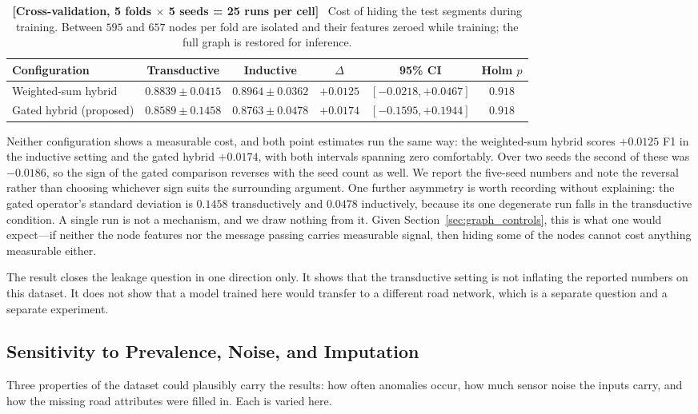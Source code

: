 \documentclass[journal]{IEEEtran}
\begin{document}
\begin{table}[!t]
  \centering
  \caption{\textbf{[Cross-validation, 5 folds $\times$ 5 seeds = 25 runs per
  cell]}~ Cost of hiding the test segments during training. Between $595$ and
  $657$ nodes per fold are isolated and their features zeroed while training;
  the full graph is restored for inference.}
  \label{tab:inductive}
  \renewcommand{\arraystretch}{1.2}
  \footnotesize
  \begin{tabular}{@{}lccccc@{}}
    \toprule
    \textbf{Configuration} & \textbf{Transductive} & \textbf{Inductive}
    & \textbf{$\Delta$} & \textbf{95\% CI} & \textbf{Holm $p$} \\ \midrule
    Weighted-sum hybrid & $0.8839 \pm 0.0415$ & $0.8964 \pm 0.0362$ & $+0.0125$ & $[-0.0218, +0.0467]$ & $0.918$ \\
    Gated hybrid (proposed) & $0.8589 \pm 0.1458$ & $0.8763 \pm 0.0478$ & $+0.0174$ & $[-0.1595, +0.1944]$ & $0.918$ \\
    \bottomrule
  \end{tabular}
\end{table}

Neither configuration shows a measurable cost, and both point estimates run
the same way: the weighted-sum hybrid scores $+0.0125$ F1 in the inductive
setting and the gated hybrid $+0.0174$, with both intervals spanning zero
comfortably. Over two seeds the second of these was $-0.0186$, so the sign
of the gated comparison reverses with the seed count as well. We report the
five-seed numbers and note the reversal rather than choosing whichever sign
suits the surrounding argument. One further asymmetry is worth recording
without explaining: the gated operator's standard deviation is $0.1458$
transductively and $0.0478$ inductively, because its one degenerate run
falls in the transductive condition. A single run is not a mechanism, and we
draw nothing from it. Given Section~\ref{sec:graph_controls}, this is what one would
expect---if neither the node features nor the message passing carries
measurable signal, then hiding some of the nodes cannot cost anything
measurable either.

The result closes the leakage question in one direction only. It shows that
the transductive setting is not inflating the reported numbers on this
dataset. It does not show that a model trained here would transfer to a
different road network, which is a separate question and a separate
experiment.

\subsection{Sensitivity to Prevalence, Noise, and Imputation}
\label{sec:sensitivity}
Three properties of the dataset could plausibly carry the results: how often
anomalies occur, how much sensor noise the inputs carry, and how the missing
road attributes were filled in. Each is varied here.
\end{document}
